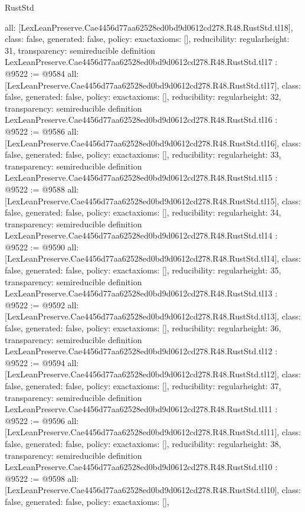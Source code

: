 \begin{lexlean}{RustStd}
\begin{coremodule}
{  all: [LexLeanPreserve.Cae4456d77aa62528ed0bd9d0612cd278.R48.RustStd.tl18],
  class: false,
  generated: false,
  policy: exact{axioms: []},
  reducibility: regular{height: 31},
  transparency: semireducible
}
definition LexLeanPreserve.Cae4456d77aa62528ed0bd9d0612cd278.R48.RustStd.tl17 : @9522 := @9584 {
  all: [LexLeanPreserve.Cae4456d77aa62528ed0bd9d0612cd278.R48.RustStd.tl17],
  class: false,
  generated: false,
  policy: exact{axioms: []},
  reducibility: regular{height: 32},
  transparency: semireducible
}
definition LexLeanPreserve.Cae4456d77aa62528ed0bd9d0612cd278.R48.RustStd.tl16 : @9522 := @9586 {
  all: [LexLeanPreserve.Cae4456d77aa62528ed0bd9d0612cd278.R48.RustStd.tl16],
  class: false,
  generated: false,
  policy: exact{axioms: []},
  reducibility: regular{height: 33},
  transparency: semireducible
}
definition LexLeanPreserve.Cae4456d77aa62528ed0bd9d0612cd278.R48.RustStd.tl15 : @9522 := @9588 {
  all: [LexLeanPreserve.Cae4456d77aa62528ed0bd9d0612cd278.R48.RustStd.tl15],
  class: false,
  generated: false,
  policy: exact{axioms: []},
  reducibility: regular{height: 34},
  transparency: semireducible
}
definition LexLeanPreserve.Cae4456d77aa62528ed0bd9d0612cd278.R48.RustStd.tl14 : @9522 := @9590 {
  all: [LexLeanPreserve.Cae4456d77aa62528ed0bd9d0612cd278.R48.RustStd.tl14],
  class: false,
  generated: false,
  policy: exact{axioms: []},
  reducibility: regular{height: 35},
  transparency: semireducible
}
definition LexLeanPreserve.Cae4456d77aa62528ed0bd9d0612cd278.R48.RustStd.tl13 : @9522 := @9592 {
  all: [LexLeanPreserve.Cae4456d77aa62528ed0bd9d0612cd278.R48.RustStd.tl13],
  class: false,
  generated: false,
  policy: exact{axioms: []},
  reducibility: regular{height: 36},
  transparency: semireducible
}
definition LexLeanPreserve.Cae4456d77aa62528ed0bd9d0612cd278.R48.RustStd.tl12 : @9522 := @9594 {
  all: [LexLeanPreserve.Cae4456d77aa62528ed0bd9d0612cd278.R48.RustStd.tl12],
  class: false,
  generated: false,
  policy: exact{axioms: []},
  reducibility: regular{height: 37},
  transparency: semireducible
}
definition LexLeanPreserve.Cae4456d77aa62528ed0bd9d0612cd278.R48.RustStd.tl11 : @9522 := @9596 {
  all: [LexLeanPreserve.Cae4456d77aa62528ed0bd9d0612cd278.R48.RustStd.tl11],
  class: false,
  generated: false,
  policy: exact{axioms: []},
  reducibility: regular{height: 38},
  transparency: semireducible
}
definition LexLeanPreserve.Cae4456d77aa62528ed0bd9d0612cd278.R48.RustStd.tl10 : @9522 := @9598 {
  all: [LexLeanPreserve.Cae4456d77aa62528ed0bd9d0612cd278.R48.RustStd.tl10],
  class: false,
  generated: false,
  policy: exact{axioms: []},
}
\end{coremodule}
\end{lexlean}
